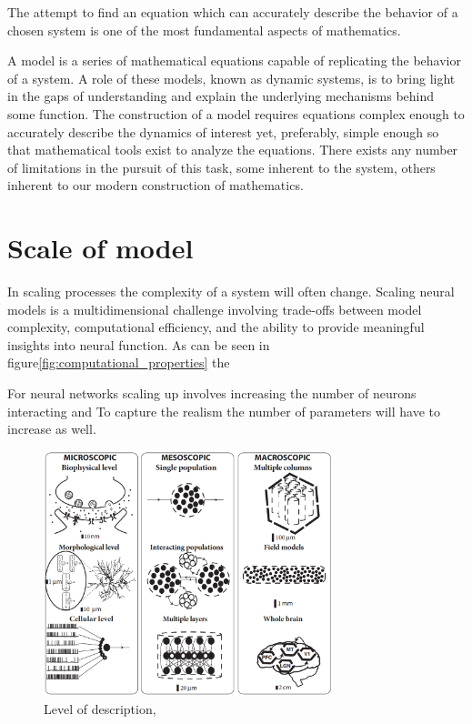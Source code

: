 \documentclass[../../Orator.tex]{subfiles}
\begin{document}
The attempt to find an equation which can accurately describe the behavior of a chosen system is one of the most fundamental aspects of mathematics.

A model is a series of mathematical equations capable of replicating the behavior of a system. A role of these models, known as dynamic systems, is to bring light in the gaps of understanding and explain the underlying mechanisms behind some function. 
The construction of a model requires equations complex enough to accurately describe the dynamics of interest yet, preferably, simple enough so that mathematical tools exist to analyze the equations\footnotemark. 
There exists any number of limitations in the pursuit of this task, some inherent to the system, others inherent to our modern construction of mathematics.





\section{Scale of model}
In scaling processes the complexity of a system will often change. Scaling neural models is a multidimensional challenge involving trade-offs between model complexity, computational efficiency, and the ability to provide meaningful insights into neural function.
As can be seen in figure\ref{fig:computational_properties} the 




For neural networks scaling up involves increasing the number of neurons interacting and 
To capture the realism the number of parameters will have to increase as well.



\begin{figure}[ht]
    \centering
    \includegraphics[width = 0.75\textwidth]{Pictures/Kenni/Level of description.png}
    \caption{Level of description, ~\cite{Burger2017}}
    \label{fig:scale}
\end{figure}
\end{document}
